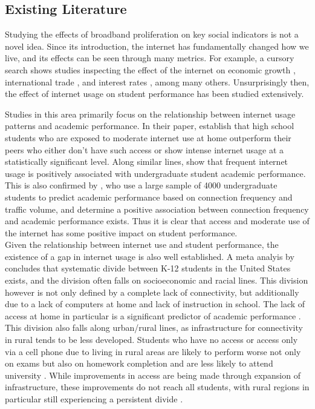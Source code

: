 \documentclass[stu, floatsintext]{apa7}
\begin{document}
    \subsection{Existing Literature}
    Studying the effects of broadband proliferation on key social indicators is not a novel idea. Since its introduction, the internet has fundamentally changed how we live, and its effects can be seen through many metrics. For example, a cursory search shows studies inspecting the effect of the internet on economic growth \autocite{CHOI200939}, international trade \autocite{Lin2015}, and interest rates \autocite{Luo2018}, among many others. Unsurprisingly then, the effect of internet usage on student performance has been studied extensively. 

    Studies in this area primarily focus on the relationship between internet usage patterns and academic performance. In their paper, \textcite{Austin2011} establish that high school students who are exposed to moderate internet use at home outperform their peers who either don't have such access or show intense internet usage at a statistically significant level. Along similar lines, \textcite{siraj2015internet} show that frequent internet usage is positively associated with undergraduate student academic performance. This is also confirmed by \textcite{XU2019166}, who use a large sample of 4000 undergraduate students to predict academic performance based on connection frequency and traffic volume, and determine a positive association between connection frequency and academic performance exists. Thus it is clear that access and moderate use of the internet has some positive impact on student performance. \\

    Given the relationship between internet use and student performance, the existence of a gap in internet usage is also well established. A meta analyis by \textcite{dolan2016} concludes that systematic divide between K-12 students in the United States exists, and the division often falls on socioeconomic and racial lines. This division however is not only defined by a complete lack of connectivity, but additionally due to a lack of computers at home and lack of instruction in school. The lack of access at home in particular is a significant predictor of academic performance \autocite{tan2018}. This division also falls along urban/rural lines, as infrastructure for connectivity in rural tends to be less developed. Students who have no access or access only via a cell phone due to living in rural areas are likely to perform worse not only on exams but also on homework completion and are less likely to attend university \autocite{hampton2020broadband}. While improvements in access are being made through expansion of infrastructure, these improvements do not reach all students, with rural regions in particular still experiencing a persistent divide \autocite{mendoza2021}.
    
\end{document}
